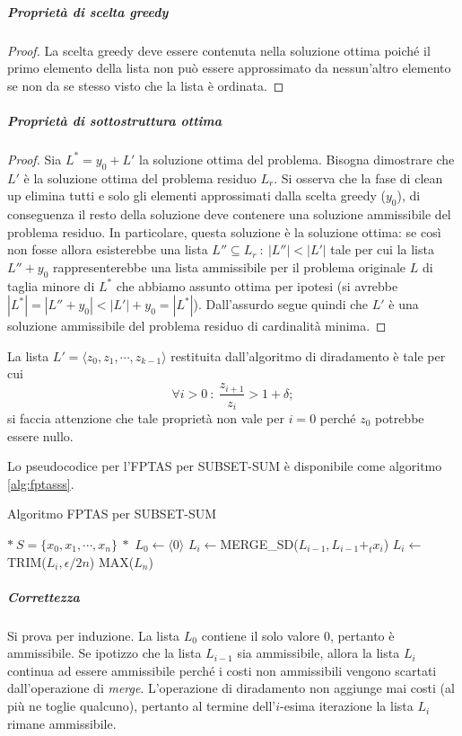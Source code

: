 \subparagraph{Proprietà di scelta greedy}
\begin{proof}
La scelta greedy deve essere contenuta nella soluzione ottima poiché il primo elemento della lista non può essere approssimato da nessun'altro elemento se non da se stesso visto che la lista è ordinata.
\end{proof}

\subparagraph{Proprietà di sottostruttura ottima}
\begin{proof}
Sia $L^*=y_0+L'$ la soluzione ottima del problema. Bisogna dimostrare che $L'$ è la soluzione ottima del problema residuo $L_r$. Si osserva che la fase di clean up elimina tutti e solo gli elementi approssimati dalla scelta greedy ($y_0$), di conseguenza il resto della soluzione deve contenere una soluzione ammissibile del problema residuo. In particolare, questa soluzione è la soluzione ottima: se così non fosse allora esisterebbe una lista $L''\subseteq L_r\ :\ |L''|<|L'|$ tale per cui la lista $L''+y_0$ rappresenterebbe una lista ammissibile per il problema originale $L$ di taglia minore di $L^*$ che abbiamo assunto ottima per ipotesi (si avrebbe $|L^*|=|L''+y_0|<|L'|+y_0=|L^*|$). Dall'assurdo segue quindi che $L'$ è una soluzione ammissibile del problema residuo di cardinalità minima.
\end{proof}


La lista $L'=\langle z_0, z_1, \cdots , z_{k-1} \rangle$ restituita dall'algoritmo di diradamento è tale per cui
\[
\forall i > 0\ :\ \frac{z_{i+1}}{z_i} > 1+\delta;
\]
si faccia attenzione che tale proprietà non vale per $i=0$ perché $z_0$ potrebbe essere nullo.

Lo pseudocodice per l'FPTAS per SUBSET-SUM è disponibile come algoritmo \ref{alg:fptasss}.

\begin{algorithm}
\caption{Algoritmo FPTAS per SUBSET-SUM}
\label{alg:fptasss}
\begin{algorithmic}
	\State $*\ S=\{ x_0, x_1, \cdots , x_n \}\ *$
	\State $L_0 \gets \langle 0 \rangle$
		\State $L_i \gets $MERGE\_SD($L_{i-1}, L_{i-1} +_t x_i$)
		\State $L_i \gets $TRIM($L_i, \epsilon/2n$)
	\EndFor
	\State \Return MAX($L_n$)
\EndFunction
\end{algorithmic}
\end{algorithm}

\subparagraph{Correttezza}
Si prova per induzione. La lista $L_0$ contiene il solo valore $0$, pertanto è ammissibile. Se ipotizzo che la lista $L_{i-1}$ sia ammissibile, allora la lista $L_i$ continua ad essere ammissibile perché i costi non ammissibili vengono scartati dall'operazione di \textit{merge}. L'operazione di diradamento non aggiunge mai costi (al più ne toglie qualcuno), pertanto al termine dell'$i$-esima iterazione la lista $L_i$ rimane ammissibile.

